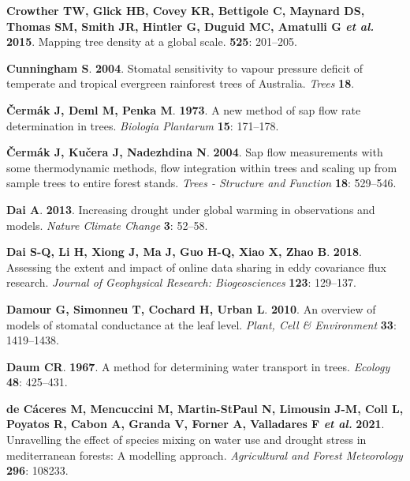 \documentclass[11pt,twoside]{reedthesis}
\begin{document}
\hypertarget{ref-Crowther2015}{}
\textbf{\textnormal{Crowther TW}, \textnormal{Glick HB},
\textnormal{Covey KR}, \textnormal{Bettigole C}, \textnormal{Maynard
DS}, \textnormal{Thomas SM}, \textnormal{Smith JR}, \textnormal{Hintler
G}, \textnormal{Duguid MC}, \textnormal{Amatulli G} \emph{et al.}}
\textbf{2015}. Mapping tree density at a global scale. \textbf{525}:
201--205.

\hypertarget{ref-cunningham_stomatal_2004}{}
\textbf{\textnormal{Cunningham S}}. \textbf{2004}. Stomatal sensitivity
to vapour pressure deficit of temperate and tropical evergreen
rainforest trees of Australia. \emph{Trees} \textbf{18}.

\hypertarget{ref-cermak1973}{}
\textbf{\textnormal{Čermák J}, \textnormal{Deml M}, \textnormal{Penka
M}}. \textbf{1973}. A new method of sap flow rate determination in
trees. \emph{Biologia Plantarum} \textbf{15}: 171--178.

\hypertarget{ref-Cermak2004}{}
\textbf{\textnormal{Čermák J}, \textnormal{Kučera J},
\textnormal{Nadezhdina N}}. \textbf{2004}. Sap flow measurements with
some thermodynamic methods, flow integration within trees and scaling up
from sample trees to entire forest stands. \emph{Trees - Structure and
Function} \textbf{18}: 529--546.

\hypertarget{ref-Dai2013}{}
\textbf{\textnormal{Dai A}}. \textbf{2013}. Increasing drought under
global warming in observations and models. \emph{Nature Climate Change}
\textbf{3}: 52--58.

\hypertarget{ref-Dai2018}{}
\textbf{\textnormal{Dai S-Q}, \textnormal{Li H}, \textnormal{Xiong J},
\textnormal{Ma J}, \textnormal{Guo H-Q}, \textnormal{Xiao X},
\textnormal{Zhao B}}. \textbf{2018}. Assessing the extent and impact of
online data sharing in eddy covariance flux research. \emph{Journal of
Geophysical Research: Biogeosciences} \textbf{123}: 129--137.

\hypertarget{ref-Damour2010}{}
\textbf{\textnormal{Damour G}, \textnormal{Simonneu T},
\textnormal{Cochard H}, \textnormal{Urban L}}. \textbf{2010}. An
overview of models of stomatal conductance at the leaf level.
\emph{Plant, Cell \& Environment} \textbf{33}: 1419--1438.

\hypertarget{ref-Daum1967}{}
\textbf{\textnormal{Daum CR}}. \textbf{1967}. A method for determining
water transport in trees. \emph{Ecology} \textbf{48}: 425--431.

\hypertarget{ref-decaceres2021}{}
\textbf{\textnormal{de Cáceres M}, \textnormal{Mencuccini M},
\textnormal{Martin-StPaul N}, \textnormal{Limousin J-M},
\textnormal{Coll L}, \textnormal{Poyatos R}, \textnormal{Cabon A},
\textnormal{Granda V}, \textnormal{Forner A}, \textnormal{Valladares F}
\emph{et al.}} \textbf{2021}. Unravelling the effect of species mixing
on water use and drought stress in mediterranean forests: A modelling
approach. \emph{Agricultural and Forest Meteorology} \textbf{296}:
108233.
\end{document}
